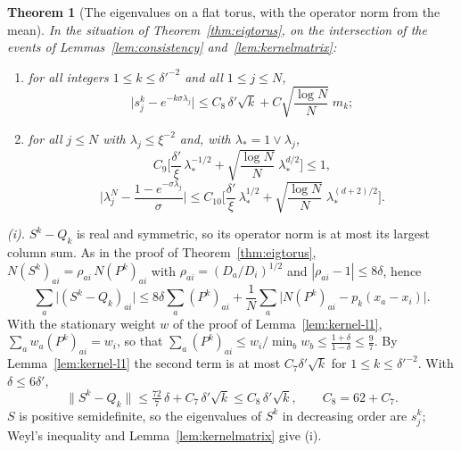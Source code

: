 \documentclass[11pt,a4paper]{article}
\makeatletter
\theoremstyle{stmt}
\newtheorem{theorem}{Theorem}[section]
\theoremstyle{defn}
\theoremstyle{rmk}
\renewenvironment{proof}[1][\proofname]{\par\pushQED{\qed}\normalfont\topsep6\p@\@plus6\p@\relax
  \trivlist\item[\hskip\labelsep{\sffamily\itshape\small #1.}]\ignorespaces}{\popQED\endtrivlist\@endpefalse}
\numberwithin{equation}{section}
\makeatother
\begin{document}
{\begin{theorem}[The eigenvalues on a flat torus, with the operator norm from the mean]\label{thm:eigtorus-l1}
In the situation of Theorem~\ref{thm:eigtorus}, on the intersection of the events of
Lemmas~\ref{lem:consistency} and~\ref{lem:kernelmatrix}:
\begin{enumerate}
\item[(i)] for all integers $1\le k\le\delta'^{-2}$ and all $1\le j\le N$,
\[
 \big|s_j^k-e^{-k\sigma\lambda_j}\big|\le C_8\,\delta'\sqrt k+C\sqrt{\frac{\log N}N}\;m_k ;
\]
\item[(ii)] for all $j\le N$ with $\lambda_j\le\xi^{-2}$ and, with $\lambda_*=1\vee\lambda_j$,
\begin{equation}\label{eq:l1-cond}
 C_9\Big[\frac{\delta'}\xi\,\lambda_*^{-1/2}+\sqrt{\frac{\log N}N}\;\lambda_*^{d/2}\Big]\le1,
\end{equation}
\[
 \Big|\lambda^N_j-\frac{1-e^{-\sigma\lambda_j}}{\sigma}\Big|\le C_{10}\Big[\frac{\delta'}\xi\,\lambda_*^{1/2}
 +\sqrt{\frac{\log N}N}\;\lambda_*^{(d+2)/2}\Big].
\]
\end{enumerate}
\end{theorem}

\begin{proof}
\emph{(i).} $S^k-Q_k$ is real and symmetric, so its operator norm is at most its largest column sum. As in
the proof of Theorem~\ref{thm:eigtorus}, $N(S^k)_{ai}=\rho_{ai}\,N(P^k)_{ai}$ with
$\rho_{ai}=(D_a/D_i)^{1/2}$ and $|\rho_{ai}-1|\le8\delta$, hence
\[
 \sum_a\big|(S^k-Q_k)_{ai}\big|\le8\delta\sum_a(P^k)_{ai}+\frac1N\sum_a\big|N(P^k)_{ai}-p_k(x_a-x_i)\big| .
\]
With the stationary weight $w$ of the proof of Lemma~\ref{lem:kernel-l1}, $\sum_aw_a(P^k)_{ai}=w_i$, so
that $\sum_a(P^k)_{ai}\le w_i/\min_bw_b\le\frac{1+\delta}{1-\delta}\le\frac97$. By
Lemma~\ref{lem:kernel-l1} the second term is at most $C_7\delta'\sqrt k$ for $1\le k\le\delta'^{-2}$. With
$\delta\le6\delta'$,
\[
 \|S^k-Q_k\|\le\tfrac{72}7\,\delta+C_7\,\delta'\sqrt k\le C_8\,\delta'\sqrt k,\qquad C_8=62+C_7 .
\]
$S$ is positive semidefinite, so the eigenvalues of $S^k$ in decreasing order are $s_j^k$; Weyl's inequality
and Lemma~\ref{lem:kernelmatrix} give (i).


\end{proof}}
\end{document}
